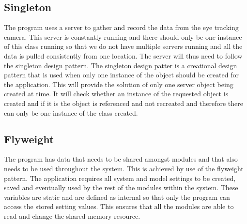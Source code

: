 \subsection{Singleton}
The program uses a server to gather and record the data from the eye tracking camera. This server is constantly running and there should only be one instance of this class running so that we do not have multiple servers running and all the data is pulled consistently from one location. The server will thus need to follow the singleton design pattern. The singleton design patter is a creational design pattern that is used when only one instance of the object should be created for the application. This will provide the solution of only one server object being created at time. It will check whether an instance of the requested object is created and if it is the object is referenced and not recreated and therefore there can only be one instance of the class created.



%

\subsection{Flyweight}
The program has data that needs to be shared amongst modules and that also needs to be used throughout the system. This is achieved by use of the flyweight pattern. The application requires all system and model settings to be created, saved and eventually used by the rest of the modules within the system. These variables are static and are defined as internal so that only the program can access the stored setting values. This ensures that all the modules are able to read and change the shared memory resource.


